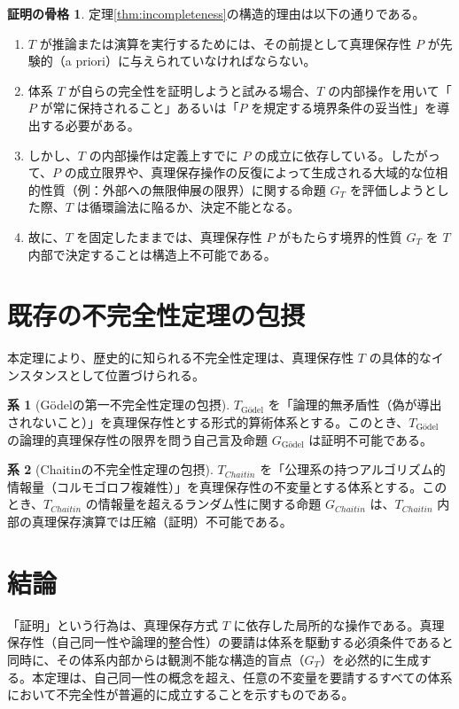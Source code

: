 \documentclass[11pt,a4paper]{article}
\theoremstyle{definition}
\newtheorem{corollary}{系}[section]
\newtheorem{proof_outline}{証明の骨格}
\begin{document}
\begin{proof_outline}
定理\ref{thm:incompleteness}の構造的理由は以下の通りである。
\begin{enumerate}
    \item $T$ が推論または演算を実行するためには、その前提として真理保存性 $P$ が先験的（a priori）に与えられていなければならない。
    \item 体系 $T$ が自らの完全性を証明しようと試みる場合、$T$ の内部操作を用いて「$P$ が常に保持されること」あるいは「$P$ を規定する境界条件の妥当性」を導出する必要がある。
    \item しかし、$T$ の内部操作は定義上すでに $P$ の成立に依存している。したがって、$P$ の成立限界や、真理保存操作の反復によって生成される大域的な位相的性質（例：外部への無限伸展の限界）に関する命題 $G_T$ を評価しようとした際、$T$ は循環論法に陥るか、決定不能となる。
    \item 故に、$T$ を固定したままでは、真理保存性 $P$ がもたらす境界的性質 $G_T$ を $T$ 内部で決定することは構造上不可能である。
\end{enumerate}
\end{proof_outline}

\section{既存の不完全性定理の包摂}

本定理により、歴史的に知られる不完全性定理は、真理保存性 $T$ の具体的なインスタンスとして位置づけられる。

\begin{corollary}[Gödelの第一不完全性定理の包摂]
$T_{\text{Gödel}}$ を「論理的無矛盾性（偽が導出されないこと）」を真理保存性とする形式的算術体系とする。このとき、$T_{\text{Gödel}}$ の論理的真理保存性の限界を問う自己言及命題 $G_{\text{Gödel}}$ は証明不可能である。
\end{corollary}

\begin{corollary}[Chaitinの不完全性定理の包摂]
$T_{Chaitin}$ を「公理系の持つアルゴリズム的情報量（コルモゴロフ複雑性）」を真理保存性の不変量とする体系とする。このとき、$T_{Chaitin}$ の情報量を超えるランダム性に関する命題 $G_{Chaitin}$ は、$T_{Chaitin}$ 内部の真理保存演算では圧縮（証明）不可能である。
\end{corollary}

\section{結論}
「証明」という行為は、真理保存方式 $T$ に依存した局所的な操作である。真理保存性（自己同一性や論理的整合性）の要請は体系を駆動する必須条件であると同時に、その体系内部からは観測不能な構造的盲点（$G_T$）を必然的に生成する。本定理は、自己同一性の概念を超え、任意の不変量を要請するすべての体系において不完全性が普遍的に成立することを示すものである。
\end{document}
